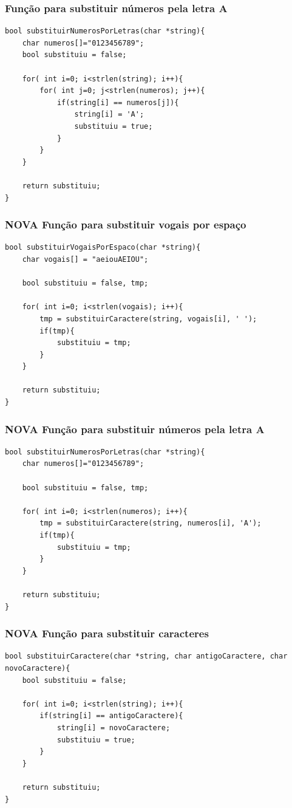 \begin{frame}[fragile]
	\frametitle{Função para substituir números pela letra A}

	\begin{verbatim}
bool substituirNumerosPorLetras(char *string){
	char numeros[]="0123456789";
	bool substituiu = false;

	for( int i=0; i<strlen(string); i++){
		for( int j=0; j<strlen(numeros); j++){
			if(string[i] == numeros[j]){
				string[i] = 'A';
				substituiu = true;
			}
		}
	}

	return substituiu;
}
	\end{verbatim}

\end{frame}

\begin{frame}[fragile]
	\frametitle{NOVA Função para substituir vogais por espaço}

	\begin{verbatim}
bool substituirVogaisPorEspaco(char *string){
	char vogais[] = "aeiouAEIOU";

	bool substituiu = false, tmp;

	for( int i=0; i<strlen(vogais); i++){
		tmp = substituirCaractere(string, vogais[i], ' ');
		if(tmp){
			substituiu = tmp;
		}
	}

	return substituiu;
}
	\end{verbatim}

\end{frame}

\begin{frame}[fragile]
	\frametitle{NOVA Função para substituir números pela letra A}

	\begin{verbatim}
bool substituirNumerosPorLetras(char *string){
	char numeros[]="0123456789";

	bool substituiu = false, tmp;

	for( int i=0; i<strlen(numeros); i++){
		tmp = substituirCaractere(string, numeros[i], 'A');
		if(tmp){
			substituiu = tmp;
		}
	}

	return substituiu;
}
	\end{verbatim}

\end{frame}

\begin{frame}[fragile]
	\frametitle{NOVA Função para substituir caracteres}

	\begin{verbatim}
bool substituirCaractere(char *string, char antigoCaractere, char novoCaractere){
	bool substituiu = false;

	for( int i=0; i<strlen(string); i++){
		if(string[i] == antigoCaractere){
			string[i] = novoCaractere;
			substituiu = true;
		}
	}

	return substituiu;
}
	\end{verbatim}

\end{frame}

